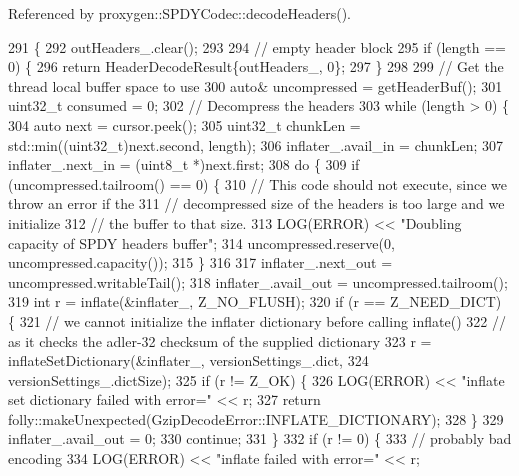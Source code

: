Referenced by proxygen\+::\+S\+P\+D\+Y\+Codec\+::decode\+Headers().


\begin{DoxyCode}
291                                                                 \{
292   outHeaders_.clear();
293 
294   \textcolor{comment}{// empty header block}
295   \textcolor{keywordflow}{if} (length == 0) \{
296     \textcolor{keywordflow}{return} HeaderDecodeResult\{outHeaders_, 0\};
297   \}
298 
299   \textcolor{comment}{// Get the thread local buffer space to use}
300   \textcolor{keyword}{auto}& uncompressed = getHeaderBuf();
301   uint32\_t consumed = 0;
302   \textcolor{comment}{// Decompress the headers}
303   \textcolor{keywordflow}{while} (length > 0) \{
304     \textcolor{keyword}{auto} next = cursor.peek();
305     uint32\_t chunkLen = std::min((uint32\_t)next.second, length);
306     inflater_.avail\_in = chunkLen;
307     inflater_.next\_in = (uint8\_t *)next.first;
308     \textcolor{keywordflow}{do} \{
309       if (uncompressed.tailroom() == 0) \{
310         \textcolor{comment}{// This code should not execute, since we throw an error if the}
311         \textcolor{comment}{// decompressed size of the headers is too large and we initialize}
312         \textcolor{comment}{// the buffer to that size.}
313         LOG(ERROR) << \textcolor{stringliteral}{"Doubling capacity of SPDY headers buffer"};
314         uncompressed.reserve(0, uncompressed.capacity());
315       \}
316 
317       inflater_.next\_out = uncompressed.writableTail();
318       inflater_.avail\_out = uncompressed.tailroom();
319       \textcolor{keywordtype}{int} r = inflate(&inflater_, Z\_NO\_FLUSH);
320       \textcolor{keywordflow}{if} (r == Z\_NEED\_DICT) \{
321         \textcolor{comment}{// we cannot initialize the inflater dictionary before calling inflate()}
322         \textcolor{comment}{// as it checks the adler-32 checksum of the supplied dictionary}
323         r = inflateSetDictionary(&inflater_, versionSettings_.dict,
324                                  versionSettings_.dictSize);
325         \textcolor{keywordflow}{if} (r != Z\_OK) \{
326           LOG(ERROR) << \textcolor{stringliteral}{"inflate set dictionary failed with error="} << r;
327           \textcolor{keywordflow}{return} folly::makeUnexpected(GzipDecodeError::INFLATE_DICTIONARY);
328         \}
329         inflater_.avail\_out = 0;
330         \textcolor{keywordflow}{continue};
331       \}
332       \textcolor{keywordflow}{if} (r != 0) \{
333         \textcolor{comment}{// probably bad encoding}
334         LOG(ERROR) << \textcolor{stringliteral}{"inflate failed with error="} << r;

\end{DoxyCode}
